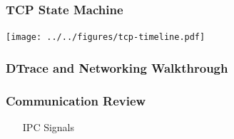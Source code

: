 \documentclass[pdftex]{beamer} %
\begin{document}
\begin{frame}[fragile]
  \frametitle{TCP State Machine}
\centering
\texttt{[image: ../../figures/tcp-timeline.pdf]}
\end{frame}

\begin{frame}
  \frametitle{DTrace and Networking Walkthrough}
  
\end{frame}

\begin{frame}
  \frametitle{Communication Review}
  \begin{enumerate}
  \item [IPC] Signals 
  \end{enumerate}
\end{frame}
\end{document}
